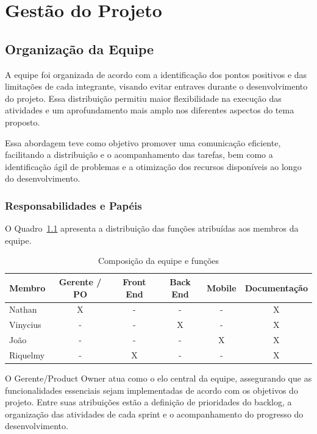 \chapter{Gestão do Projeto}

\section{Organização da Equipe}

A equipe foi organizada de acordo com a identificação dos pontos positivos e das limitações de cada integrante, visando evitar entraves durante o desenvolvimento do projeto. Essa distribuição permitiu maior flexibilidade na execução das atividades e um aprofundamento mais amplo nos diferentes aspectos do tema proposto.

Essa abordagem teve como objetivo promover uma comunicação eficiente, facilitando a distribuição e o acompanhamento das tarefas, bem como a identificação ágil de problemas e a otimização dos recursos disponíveis ao longo do desenvolvimento.

\subsection{Responsabilidades e Papéis}

O Quadro~\ref{quad_equipe} apresenta a distribuição das funções atribuídas aos membros da equipe.

\begin{table}[H]
\caption{Composição da equipe e funções}
\label{quad_equipe}
\centering
\begin{tabular}{lccccc}
\hline
\textbf{Membro} &
\textbf{Gerente / PO} &
\textbf{Front End} &
\textbf{Back End} &
\textbf{Mobile} &
\textbf{Documentação} \\
\hline
Nathan    & X & - & - & - & X \\
Vinycius  & - & - & X & - & X \\
João      & - & - & - & X & X \\
Riquelmy  & - & X & - & - & X \\
\hline
\end{tabular}
\end{table}

O Gerente/Product Owner atua como o elo central da equipe, assegurando que as funcionalidades essenciais sejam implementadas de acordo com os objetivos do projeto. Entre suas atribuições estão a definição de prioridades do backlog, a organização das atividades de cada sprint e o acompanhamento do progresso do desenvolvimento.

